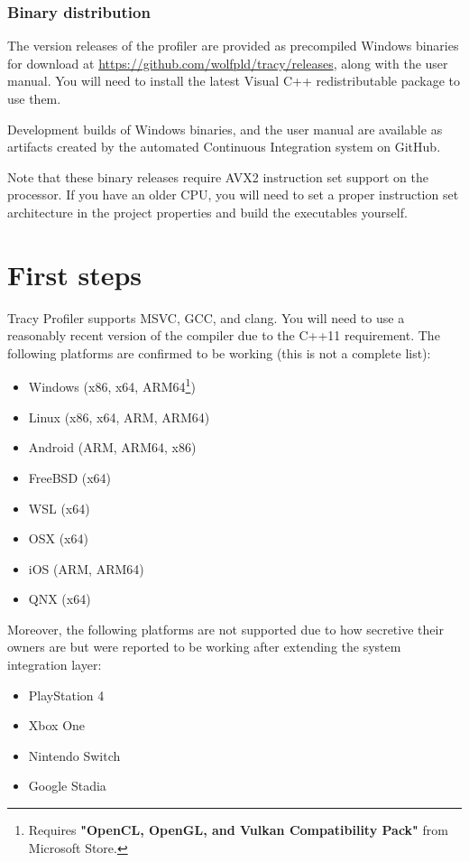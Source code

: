 \documentclass[hidelinks,titlepage,a4paper,twoside]{article}
\begin{document}
\subsubsection{Binary distribution}

The version releases of the profiler are provided as precompiled Windows binaries for download at \url{https://github.com/wolfpld/tracy/releases}, along with the user manual. You will need to install the latest Visual C++ redistributable package to use them.

Development builds of Windows binaries, and the user manual are available as artifacts created by the automated Continuous Integration system on GitHub.

Note that these binary releases require AVX2 instruction set support on the processor. If you have an older CPU, you will need to set a proper instruction set architecture in the project properties and build the executables yourself.

\section{First steps}
\label{firststeps}

Tracy Profiler supports  MSVC, GCC, and clang. You will need to use a reasonably recent version of the compiler due to the C++11 requirement. The following platforms are confirmed to be working (this is not a complete list):

\begin{itemize}
\item Windows (x86, x64, ARM64\footnote{Requires \textbf{"OpenCL, OpenGL, and Vulkan Compatibility Pack"} from Microsoft Store.})
\item Linux (x86, x64, ARM, ARM64)
\item Android (ARM, ARM64, x86)
\item FreeBSD (x64)
\item WSL (x64)
\item OSX (x64)
\item iOS (ARM, ARM64)
\item QNX (x64)
\end{itemize}

Moreover, the following platforms are not supported due to how secretive their owners are but were reported to be working after extending the system integration layer:

\begin{itemize}
\item PlayStation 4
\item Xbox One
\item Nintendo Switch
\item Google Stadia
\end{itemize}
\end{document}

